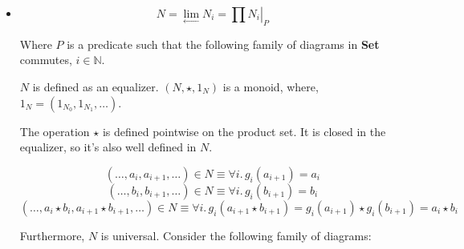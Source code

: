 \documentclass{article}
\begin{document}
\begin{enumerate}
\begin{itemize}

       \item  

         $$N = \lim_{\longleftarrow} N_i = \left . {\prod N_i} \right \vert _P$$

         Where $P$ is a predicate such that the following family of
         diagrams in {\bf Set} commutes, $i \in \mathbb{N}$.


         $N$ is defined as an equalizer. $(N, \star, 1_N)$ is a monoid,
         where, $1_N = \left ( 1_{N_0}, 1_{N_1}, … \right )$.

         The operation $\star$ is defined pointwise on the product set.
         It is closed in the equalizer, so it's also well defined in $N$.

         $$(…, a_i, a_{i+1}, …) \in N \equiv \forall i .\, g_i(a_{i+1}) = a_i $$
         $$(…, b_i, b_{i+1}, …) \in N \equiv \forall i .\, g_i(b_{i+1}) = b_i $$
         $$(…, a_i \star b_i, a_{i+1} \star b_{i+1}, …) \in N \equiv \forall i.\, g_i(a_{i+1} \star b_{i+1}) = g_i(a_{i+1}) \star g_i(b_{i+1}) = a_i \star b_i$$


         Furthermore, $N$ is universal. Consider the following family of diagrams:


\end{itemize}
\end{enumerate}
\end{document}
